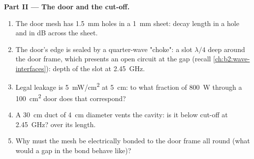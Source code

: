 \begin{problem}
\medskip
\noindent\textbf{Part II --- The door and the cut-off.}
\begin{enumerate}[resume]
  \item The door mesh has \qty{1.5}{mm} holes in a \qty{1}{mm} sheet: decay
        length in a hole and  in dB across the sheet.
  \item The door's edge is sealed by a quarter-wave "choke": a slot
        $\lambda/4$ deep around the door frame, which presents an open
        circuit at the gap (recall \cref{ch:b2:wave-interfaces}): depth
        of the slot at \qty{2.45}{GHz}.
  \item Legal leakage is \qty{5}{mW/cm^2} at \qty{5}{cm}: to what fraction of
        \qty{800}{W} through a \qty{100}{cm^2} door does that correspond?
  \item A \qty{30}{cm} duct of \qty{4}{cm} diameter vents the cavity: is it
        below cut-off at \qty{2.45}{GHz}?  over its length.
  \item Why must the mesh be electrically bonded to the door frame all
        round (what would a gap in the bond behave like)?
\end{enumerate}


\end{problem}
